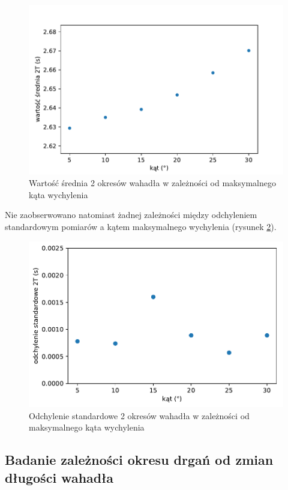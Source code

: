 \documentclass[a4paper]{article}
\begin{document}
\begin{figure}[h!]
\centering
	\includegraphics[scale=0.7]{wykres-1_0.pdf}
\caption{Wartość średnia 2 okresów wahadła w zależności od maksymalnego kąta wychylenia}
\label{fig:mean}
\end{figure}

Nie zaobserwowano natomiast żadnej zależności między odchyleniem standardowym pomiarów 
a kątem maksymalnego wychylenia (rysunek \ref{fig:std}).


\begin{figure}[h!]
\centering
	\includegraphics[scale=0.7]{wykres-2_1.pdf}
\caption{Odchylenie standardowe 2 okresów wahadła w zależności od maksymalnego kąta wychylenia}
\label{fig:std}
\end{figure}


\subsection{Badanie zależności okresu drgań od zmian długości wahadła}
\end{document}
